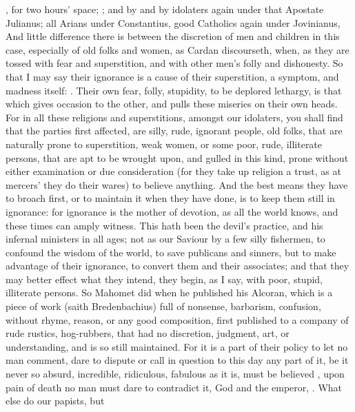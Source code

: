{, for two
hours' space; ; and by and by idolaters again under that Apostate
Julianus; all Arians under Constantius, good Catholics again under
Jovinianus, And little difference there is between the discretion of
men and children in this case, especially of old folks and women, as
 Cardan discourseth, when, as they are tossed with fear and
superstition, and with other men's folly and dishonesty. So that I may
say their ignorance is a cause of their superstition, a symptom, and
madness itself: . Their own fear,
folly, stupidity, to be deplored lethargy, is that which gives occasion
to the other, and pulls these miseries on their own heads. For in all
these religions and superstitions, amongst our idolaters, you shall
find that the parties first affected, are silly, rude, ignorant people,
old folks, that are naturally prone to superstition, weak women, or
some poor, rude, illiterate persons, that are apt to be wrought upon,
and gulled in this kind, prone without either examination or due
consideration (for they take up religion a trust, as at mercers' they
do their wares) to believe anything. And the best means they have to
broach first, or to maintain it when they have done, is to keep them
still in ignorance: for ignorance is the mother of devotion, as all the
world knows, and these times can amply witness. This hath been the
devil's practice, and his infernal ministers in all ages; not as our
Saviour by a few silly fishermen, to confound the wisdom of the world,
to save publicans and sinners, but to make advantage of their
ignorance, to convert them and their associates; and that they may
better effect what they intend, they begin, as I say, with poor,
stupid, illiterate persons. So Mahomet did when he published his
Alcoran, which is a piece of work (saith Bredenbachius) full of
nonsense, barbarism, confusion, without rhyme, reason, or any good
composition, first published to a company of rude rustics, hog-rubbers,
that had no discretion, judgment, art, or understanding, and is so
still maintained. For it is a part of their policy to let no man
comment, dare to dispute or call in question to this day any part of
it, be it never so absurd, incredible, ridiculous, fabulous as it is,
must be believed , upon pain of death no man must dare to
contradict it, God and the emperor, \etc{}. What else do our papists, but
}
